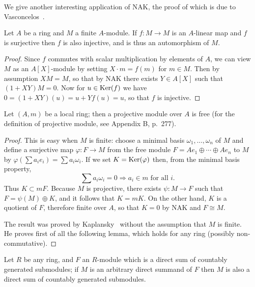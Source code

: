 We give another interesting application of NAK, the proof of which is
due to Vasconcelos~\cite{Vas2}.

\begin{theorem}\label{thm:2.4}
Let $A$ be a ring and $M$ a finite $A$-module. If $f\colon M \to M$
is an $A$-linear map and $f$ is surjective then $f$ is also injective, and is thus
an automorphism of $M$.
\end{theorem}

\begin{proof}
Since $f$ commutes with scalar multiplication by elements of $A$, we
can view $M$ as an $A[X]$-module by setting $X \cdot m = f(m)$ for $m \in M$. Then by
assumption $XM = M$, so that by NAK there exists $Y \in A[X]$ such that
$(1 + XY)M = 0$. Now for $u \in \operatorname{Ker}(f)$ we have $0 = (1 + XY)(u) = u + Yf(u) = u$, so
that $f$ is injective.
\end{proof}

\begin{theorem}\label{thm:2.5}
Let $(A, m)$ be a local ring; then a projective module over $A$
is free (for the definition of projective module, see Appendix B, p.~277).
\end{theorem}

\begin{proof}
\renewcommand{\qedsymbol}{}%
This is easy when $M$ is finite: choose a minimal basis $\omega_1, \ldots, \omega_n$ of $M$
and define a surjective map $\varphi\colon F \to M$ from the free module
$F = Ae_1 \oplus \cdots \oplus Ae_n$ to $M$ by $\varphi(\sum a_ie_i) = \sum a_i\omega_i$. If we set $K = \operatorname{Ker}(\varphi)$ then, from
the minimal basis property,
\[
  \sum a_i\omega_i = 0 \Rightarrow a_i \in m \text{ for all } i.
\]
Thus $K \subset mF$. Because $M$ is projective, there exists $\psi\colon M \to F$ such that
$F = \psi(M) \oplus K$, and it follows that $K = mK$. On the other hand, $K$ is a
quotient of $F$, therefore finite over $A$, so that $K = 0$ by NAK and $F \cong M$.

The result was proved by Kaplansky~\cite{Kap2} without the assumption that
$M$ is finite. He proves first of all the following lemma, which holds for
any ring (possibly non-commutative).
\end{proof}

\begin{lemma}\label{lem:2.1}
Let $R$ be any ring, and $F$ an $R$-module which is a direct sum of
countably generated submodules; if $M$ is an arbitrary direct summand of $F$
then $M$ is also a direct sum of countably generated submodules.
\end{lemma}

